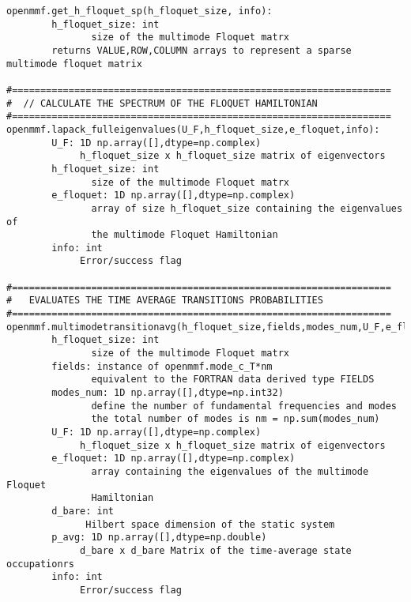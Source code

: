 \documentclass[10pt,a4paper]{article}
\begin{document}
\begin{verbatim}
openmmf.get_h_floquet_sp(h_floquet_size, info):
        h_floquet_size: int
               size of the multimode Floquet matrx
        returns VALUE,ROW,COLUMN arrays to represent a sparse multimode floquet matrix

#===================================================================
#  // CALCULATE THE SPECTRUM OF THE FLOQUET HAMILTONIAN
#===================================================================
openmmf.lapack_fulleigenvalues(U_F,h_floquet_size,e_floquet,info):    
        U_F: 1D np.array([],dtype=np.complex)
             h_floquet_size x h_floquet_size matrix of eigenvectors            
        h_floquet_size: int
               size of the multimode Floquet matrx
        e_floquet: 1D np.array([],dtype=np.complex)
               array of size h_floquet_size containing the eigenvalues of
               the multimode Floquet Hamiltonian
        info: int
             Error/success flag

#===================================================================
#   EVALUATES THE TIME AVERAGE TRANSITIONS PROBABILITIES
#===================================================================
openmmf.multimodetransitionavg(h_floquet_size,fields,modes_num,U_F,e_floquet,d_bare,p_avg,info):
        h_floquet_size: int
               size of the multimode Floquet matrx
        fields: instance of openmmf.mode_c_T*nm 
               equivalent to the FORTRAN data derived type FIELDS
        modes_num: 1D np.array([],dtype=np.int32)
               define the number of fundamental frequencies and modes
               the total number of modes is nm = np.sum(modes_num)
        U_F: 1D np.array([],dtype=np.complex)
             h_floquet_size x h_floquet_size matrix of eigenvectors            
        e_floquet: 1D np.array([],dtype=np.complex)
               array containing the eigenvalues of the multimode Floquet
               Hamiltonian
        d_bare: int
              Hilbert space dimension of the static system
        p_avg: 1D np.array([],dtype=np.double)
             d_bare x d_bare Matrix of the time-average state occupationrs                          
        info: int
             Error/success flag


\end{verbatim}
\end{document}
